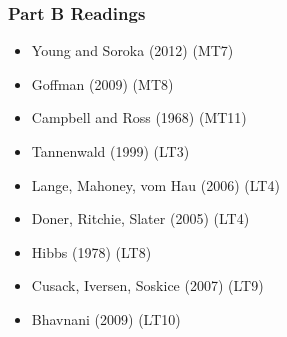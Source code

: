 \documentclass[17pt]{beamer} %
\begin{document}



\frame{}





\begin{frame}

\frametitle{Part B Readings}

\footnotesize

\begin{itemize}
\item Young and Soroka (2012) (MT7)
\item Goffman (2009) (MT8)
\item Campbell and Ross (1968) (MT11)
\item Tannenwald (1999) (LT3)
\item Lange, Mahoney, vom Hau (2006) (LT4)
\item Doner, Ritchie, Slater (2005) (LT4)
\item Hibbs (1978) (LT8)
\item Cusack, Iversen, Soskice (2007) (LT9)
\item Bhavnani (2009) (LT10)
\end{itemize}

\end{frame}



\appendix
\frame{}
\end{document}
